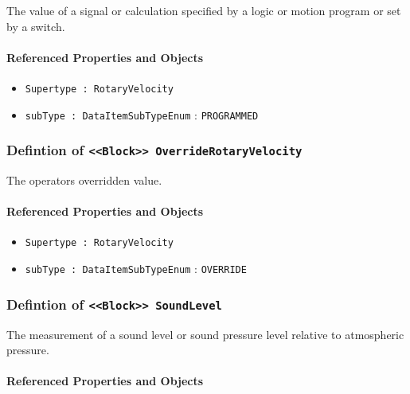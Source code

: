 The value of a signal or calculation specified by a logic or motion program or set by a switch.

\FloatBarrier
\paragraph{Referenced Properties and Objects}

\begin{itemize}
\item \texttt{Supertype : RotaryVelocity}

\item \texttt{subType : DataItemSubTypeEnum} : \texttt{PROGRAMMED}

\end{itemize}
\FloatBarrier
\subsubsection{Defintion of \texttt{<<Block>> OverrideRotaryVelocity}}
  \label{type:OverrideRotaryVelocity}

\FloatBarrier

The operators overridden value.

\FloatBarrier
\paragraph{Referenced Properties and Objects}

\begin{itemize}
\item \texttt{Supertype : RotaryVelocity}

\item \texttt{subType : DataItemSubTypeEnum} : \texttt{OVERRIDE}

\end{itemize}
\FloatBarrier
\subsubsection{Defintion of \texttt{<<Block>> SoundLevel}}
  \label{type:SoundLevel}

\FloatBarrier

The measurement of a sound level or sound pressure level relative to atmospheric pressure.

\FloatBarrier
\paragraph{Referenced Properties and Objects}

